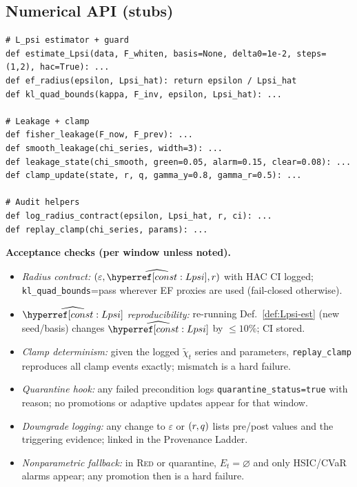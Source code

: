 \subsection*{Numerical API (stubs)}
\begin{lstlisting}
# L_psi estimator + guard
def estimate_Lpsi(data, F_whiten, basis=None, delta0=1e-2, steps=(1,2), hac=True): ...
def ef_radius(epsilon, Lpsi_hat): return epsilon / Lpsi_hat
def kl_quad_bounds(kappa, F_inv, epsilon, Lpsi_hat): ...

# Leakage + clamp
def fisher_leakage(F_now, F_prev): ...
def smooth_leakage(chi_series, width=3): ...
def leakage_state(chi_smooth, green=0.05, alarm=0.15, clear=0.08): ...
def clamp_update(state, r, q, gamma_y=0.8, gamma_r=0.5): ...

# Audit helpers
def log_radius_contract(epsilon, Lpsi_hat, r, ci): ...
def replay_clamp(chi_series, params): ...
\end{lstlisting}

\begin{mdframed}
\textbf{Acceptance checks (per window unless noted).}
\begin{itemize}[leftmargin=*]
\item \emph{Radius contract:} $(\varepsilon,\widehat{\constref{Lpsi}},r)$ with HAC CI logged; \texttt{kl\_quad\_bounds}=\textsf{pass} wherever EF proxies are used (fail-closed otherwise).
\item \emph{$\widehat{\constref{Lpsi}}$ reproducibility:} re-running Def.~\ref{def:Lpsi-est} (new seed/basis) changes $\widehat{\constref{Lpsi}}$ by $\le 10\%$; CI stored.
\item \emph{Clamp determinism:} given the logged $\tilde\chi_t$ series and parameters, \texttt{replay\_clamp} reproduces all clamp events exactly; mismatch is a hard failure.
\item \emph{Quarantine hook:} any failed precondition logs \texttt{quarantine\_status=true} with reason; no promotions or adaptive updates appear for that window.
\item \emph{Downgrade logging:} any change to $\varepsilon$ or $(r,q)$ lists pre/post values and the triggering evidence; linked in the Provenance Ladder.
\item \emph{Nonparametric fallback:} in \textsc{Red} or quarantine, $E_t=\varnothing$ and only HSIC/CVaR alarms appear; any promotion then is a hard failure.
\end{itemize}
\end{mdframed}

